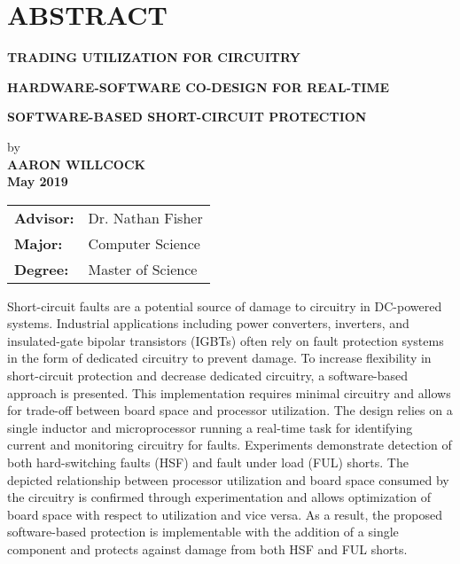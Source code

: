 \section*{ABSTRACT}
\centerline{\bf TRADING UTILIZATION FOR CIRCUITRY}
\vspace{-0.4cm}
\centerline{\bf HARDWARE-SOFTWARE CO-DESIGN FOR REAL-TIME}
\vspace{-0.4cm}
\centerline{\bf SOFTWARE-BASED SHORT-CIRCUIT PROTECTION}

{\setlength\baselineskip{0.3in}
\begin{center}
by\\
\medskip
{\bf AARON WILLCOCK}\\
\medskip
{\bf May 2019}\\
\end{center}
\Vspc
\begin{tabular}{ll}
	{\bf Advisor:} & Dr. Nathan Fisher \\
	{\bf Major:} & Computer Science \\
	{\bf Degree:} & Master of Science
\end{tabular}
}

\bigskip \bigskip

Short-circuit faults are a potential source of damage to circuitry in DC-powered systems. Industrial applications including power converters, inverters, and insulated-gate bipolar transistors (IGBTs) often rely on fault protection systems in the form of dedicated circuitry to prevent damage. To increase flexibility in short-circuit protection and decrease dedicated circuitry, a software-based approach is presented. This implementation requires minimal circuitry and allows for trade-off between board space and processor utilization. The design relies on a single inductor and microprocessor running a real-time task for identifying current and monitoring circuitry for faults. Experiments demonstrate detection of both hard-switching faults (HSF) and fault under load (FUL) shorts. The depicted relationship between processor utilization and board space consumed by the circuitry is confirmed through experimentation and allows optimization of board space with respect to utilization and vice versa. As a result, the proposed software-based protection is implementable with the addition of a single component and protects against damage from both HSF and FUL shorts.